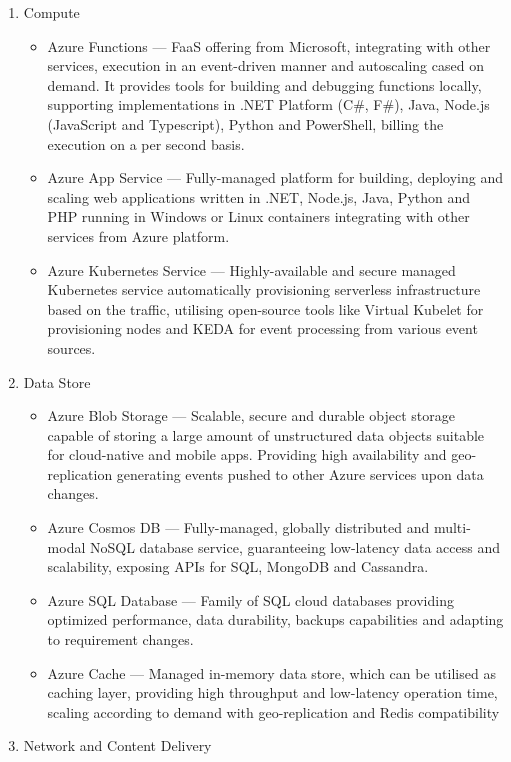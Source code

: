 \begin{enumerate}
   \item Compute
   \begin{itemize}
       \item Azure Functions --- FaaS offering from Microsoft, integrating with other services, execution in an event-driven manner and autoscaling cased on demand. It provides tools for building and debugging functions locally, supporting implementations in .NET Platform (C\#, F\#), Java, Node.js (JavaScript and Typescript), Python and PowerShell, billing the execution on a per second basis.
       \item Azure App Service --- Fully-managed platform for building, deploying and scaling web applications written in .NET, Node.js, Java, Python and PHP running in Windows or Linux containers integrating with other services from Azure platform.
       \item Azure Kubernetes Service --- Highly-available and secure managed Kubernetes service automatically provisioning serverless infrastructure based on the traffic, utilising open-source tools like Virtual Kubelet for provisioning nodes and KEDA for event processing from various event sources.
   \end{itemize}
   \item Data Store
   \begin{itemize}
       \item Azure Blob Storage --- Scalable, secure and durable object storage capable of storing a large amount of unstructured data objects suitable for cloud-native and mobile apps. Providing high availability and geo-replication generating events pushed to other Azure services upon data changes.
       \item Azure Cosmos DB --- Fully-managed, globally distributed and multi-modal NoSQL database service, guaranteeing low-latency data access and scalability, exposing APIs for SQL, MongoDB and Cassandra.
       \item Azure SQL Database --- Family of SQL cloud databases providing optimized performance, data durability, backups capabilities and adapting to requirement changes.
       \item Azure Cache --- Managed in-memory data store, which can be utilised as caching layer, providing high throughput and low-latency operation time, scaling according to demand with geo-replication and Redis compatibility
   \end{itemize}
   \item Network and Content Delivery

\end{enumerate}
